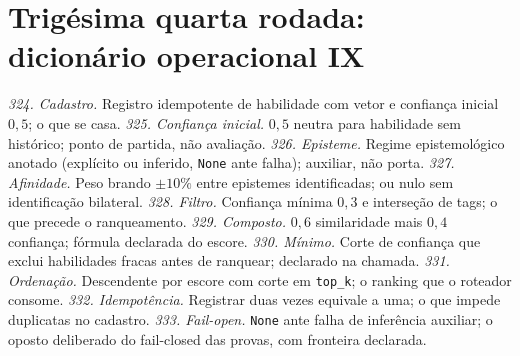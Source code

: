 \section{Trigésima quarta rodada: dicionário operacional IX}
\textit{324. Cadastro.} Registro idempotente de habilidade com vetor e confiança inicial $0{,}5$; o que se casa.
\textit{325. Confiança inicial.} $0{,}5$ neutra para habilidade sem histórico; ponto de partida, não avaliação.
\textit{326. Episteme.} Regime epistemológico anotado (explícito ou inferido, \texttt{None} ante falha); auxiliar, não porta.
\textit{327. Afinidade.} Peso brando $\pm10\%$ entre epistemes identificadas; ou nulo sem identificação bilateral.
\textit{328. Filtro.} Confiança mínima $0{,}3$ e interseção de tags; o que precede o ranqueamento.
\textit{329. Composto.} $0{,}6$ similaridade mais $0{,}4$ confiança; fórmula declarada do escore.
\textit{330. Mínimo.} Corte de confiança que exclui habilidades fracas antes de ranquear; declarado na chamada.
\textit{331. Ordenação.} Descendente por escore com corte em \texttt{top\_k}; o ranking que o roteador consome.
\textit{332. Idempotência.} Registrar duas vezes equivale a uma; o que impede duplicatas no cadastro.
\textit{333. Fail-open.} \texttt{None} ante falha de inferência auxiliar; o oposto deliberado do fail-closed das provas, com fronteira declarada.
